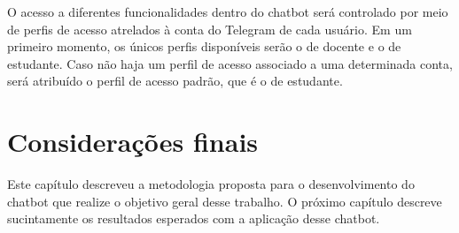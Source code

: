 \begin{figure}[ht]
   	\captionsetup{width=16cm}
\end{figure}

O acesso a diferentes funcionalidades dentro do chatbot será controlado por meio de perfis de acesso atrelados à conta do Telegram de cada usuário. Em um primeiro momento, os únicos perfis disponíveis serão o de docente e o de estudante. Caso não haja um perfil de acesso associado a uma determinada conta, será atribuído o perfil de acesso padrão, que é o de estudante.

\section{Considerações finais}
\label{sec:mp-consideracoes-finais}

Este capítulo descreveu a metodologia proposta para o desenvolvimento do chatbot que realize o objetivo geral desse trabalho. O próximo capítulo descreve sucintamente os resultados esperados com a aplicação desse chatbot.